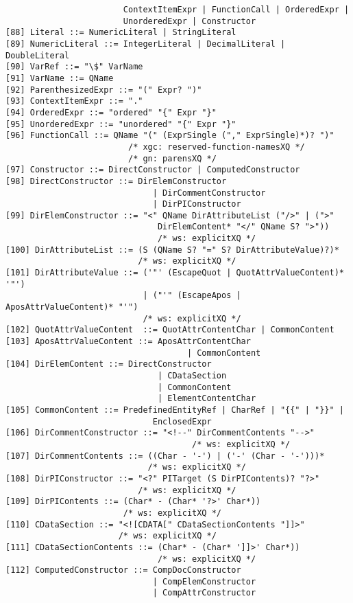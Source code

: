 \begin{verbatim}
                        ContextItemExpr | FunctionCall | OrderedExpr |
                        UnorderedExpr | Constructor 
[88] Literal ::= NumericLiteral | StringLiteral
[89] NumericLiteral ::= IntegerLiteral | DecimalLiteral | DoubleLiteral
[90] VarRef ::= "\$" VarName
[91] VarName ::= QName
[92] ParenthesizedExpr ::= "(" Expr? ")"
[93] ContextItemExpr ::= "."
[94] OrderedExpr ::= "ordered" "{" Expr "}"
[95] UnorderedExpr ::= "unordered" "{" Expr "}"
[96] FunctionCall ::= QName "(" (ExprSingle ("," ExprSingle)*)? ")" 
                         /* xgc: reserved-function-namesXQ */
                         /* gn: parensXQ */
[97] Constructor ::= DirectConstructor | ComputedConstructor
[98] DirectConstructor ::= DirElemConstructor
                              | DirCommentConstructor
                              | DirPIConstructor
[99] DirElemConstructor ::= "<" QName DirAttributeList ("/>" | (">"
                               DirElemContent* "</" QName S? ">"))	
                               /* ws: explicitXQ */
[100] DirAttributeList ::= (S (QName S? "=" S? DirAttributeValue)?)*	
                           /* ws: explicitXQ */
[101] DirAttributeValue ::= ('"' (EscapeQuot | QuotAttrValueContent)* '"')
                            | ("'" (EscapeApos | AposAttrValueContent)* "'")	
                            /* ws: explicitXQ */ 
[102] QuotAttrValueContent	::= QuotAttrContentChar | CommonContent
[103] AposAttrValueContent ::= AposAttrContentChar
                                     | CommonContent
[104] DirElemContent ::= DirectConstructor
                               | CDataSection
                               | CommonContent
                               | ElementContentChar
[105] CommonContent ::= PredefinedEntityRef | CharRef | "{{" | "}}" |
                              EnclosedExpr
[106] DirCommentConstructor ::= "<!--" DirCommentContents "-->"
                                      /* ws: explicitXQ */
[107] DirCommentContents ::= ((Char - '-') | ('-' (Char - '-')))*	
                             /* ws: explicitXQ */
[108] DirPIConstructor ::= "<?" PITarget (S DirPIContents)? "?>"	
                           /* ws: explicitXQ */
[109] DirPIContents ::= (Char* - (Char* '?>' Char*))	
                        /* ws: explicitXQ */
[110] CDataSection ::= "<![CDATA[" CDataSectionContents "]]>"
                       /* ws: explicitXQ */
[111] CDataSectionContents ::= (Char* - (Char* ']]>' Char*))	
                               /* ws: explicitXQ */ 
[112] ComputedConstructor ::= CompDocConstructor
                              | CompElemConstructor
                              | CompAttrConstructor

\end{verbatim}
